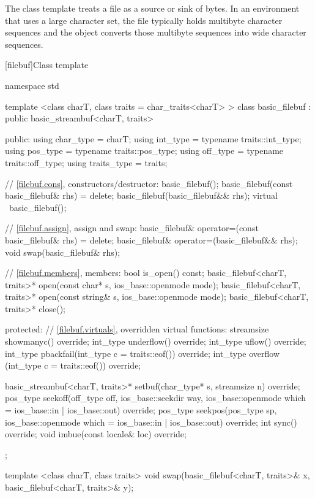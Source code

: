 \pnum
\begin{note} The class template  treats a file as a source or
sink of bytes. In an environment that uses a large character set, the file
typically holds multibyte character sequences and the 
object converts those multibyte sequences into wide character sequences.
\end{note}

[filebuf]{Class template }

%
\begin{codeblock}
namespace std {
  template <class charT, class traits = char_traits<charT> >
  class basic_filebuf
    : public basic_streambuf<charT, traits> {
  public:
    using char_type   = charT;
    using int_type    = typename traits::int_type;
    using pos_type    = typename traits::pos_type;
    using off_type    = typename traits::off_type;
    using traits_type = traits;

    // \ref{filebuf.cons}, constructors/destructor:
    basic_filebuf();
    basic_filebuf(const basic_filebuf& rhs) = delete;
    basic_filebuf(basic_filebuf&& rhs);
    virtual ~basic_filebuf();

    // \ref{filebuf.assign}, assign and swap:
    basic_filebuf& operator=(const basic_filebuf& rhs) = delete;
    basic_filebuf& operator=(basic_filebuf&& rhs);
    void swap(basic_filebuf& rhs);

    // \ref{filebuf.members}, members:
    bool is_open() const;
    basic_filebuf<charT, traits>* open(const char* s,
                                       ios_base::openmode mode);
    basic_filebuf<charT, traits>* open(const string& s,
                                       ios_base::openmode mode);
    basic_filebuf<charT, traits>* close();

  protected:
    // \ref{filebuf.virtuals}, overridden virtual functions:
    streamsize showmanyc() override;
    int_type underflow() override;
    int_type uflow() override;
    int_type pbackfail(int_type c = traits::eof()) override;
    int_type overflow (int_type c = traits::eof()) override;

    basic_streambuf<charT, traits>* setbuf(char_type* s,
                                           streamsize n) override;
    pos_type seekoff(off_type off, ios_base::seekdir way,
                     ios_base::openmode which
                      = ios_base::in | ios_base::out) override;
    pos_type seekpos(pos_type sp,
                     ios_base::openmode which
                      = ios_base::in | ios_base::out) override;
    int      sync() override;
    void     imbue(const locale& loc) override;
  };

  template <class charT, class traits>
    void swap(basic_filebuf<charT, traits>& x,
              basic_filebuf<charT, traits>& y);
}
\end{codeblock}

